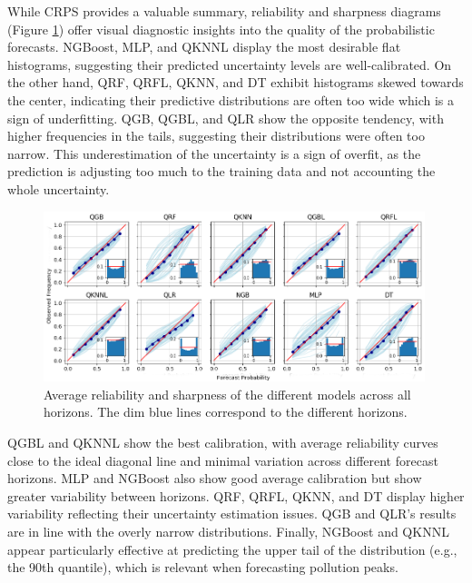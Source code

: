 \documentclass[12pt,a4paper]{book}
\begin{document}
While CRPS provides a valuable summary, reliability and sharpness diagrams (Figure \ref{figure:exp1_rel_sharp}) offer visual diagnostic insights into the quality of the probabilistic forecasts. NGBoost, MLP, and QKNNL display the most desirable flat histograms, suggesting their predicted uncertainty levels are well-calibrated. On the other hand, QRF, QRFL, QKNN, and DT exhibit histograms skewed towards the center, indicating their predictive distributions are often too wide which is a sign of underfitting. QGB, QGBL, and QLR show the opposite tendency, with higher frequencies in the tails, suggesting their distributions were often too narrow. This underestimation of the uncertainty is a sign of overfit, as the prediction is adjusting too much to the training data and not accounting the whole uncertainty.

\begin{figure}
  \centering
  \includegraphics[width=0.99\textwidth]{exp1_relsharp.png}
  \caption{\label{figure:exp1_rel_sharp}Average reliability and sharpness
    of the different models across all horizons. The dim blue lines
    correspond to the different horizons. }
\end{figure}  

QGBL and QKNNL show the best calibration, with average reliability curves close to the ideal diagonal line and minimal variation across different forecast horizons. MLP and NGBoost also show good average calibration but show greater variability between horizons. QRF, QRFL, QKNN, and DT display higher variability reflecting their uncertainty estimation issues. QGB and QLR's results are in line with the overly narrow distributions. Finally, NGBoost and QKNNL appear particularly effective at predicting the upper tail of the distribution (e.g., the 90th quantile), which is relevant when forecasting pollution peaks.
\end{document}

